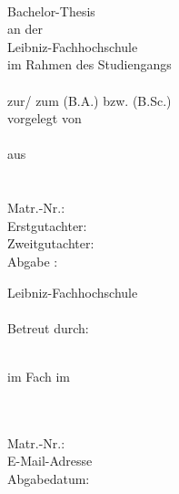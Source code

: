 \documentclass[a4paper, 11pt, german ]{article}
\def\True{1}
\begin{document}

\begin{titlepage}
\if\BachlorThesis\True
	\vspace*{20ex}
	\begin{center}
		
		\textbf{\thetitle}\\
		\vspace{10ex}
		Bachelor-Thesis\\
		an der \\
		Leibniz-Fachhochschule\\
		im Rahmen des Studiengangs \\
		\Studiengang \\
		zur/ zum \Abschlussbezeinung (B.A.) bzw. (B.Sc.) \\
	
		\vspace{1ex}
		vorgelegt von \\
		\theauthor \\
		aus\\
		\Addresse\\
		\Email\\
		
		\vspace{1ex}
		Matr.-Nr.: \MatrNummer\\
		
		\vspace{10ex}
		Erstgutachter: \Pruefer \\
		Zweitgutachter: \ZweitGutachter \\
		\vspace{1ex}
		Abgabe : \thedate
	\end{center}

\else


\raggedright
\vspace*{20ex}
Leibniz-Fachhochschule\\
\Studiengang\\
Betreut durch: \Pruefer

\vspace{10ex}
\begin{center}
	\ArtArbeit\\
	\vspace{1ex}
	im Fach \Modul im \Semester\\
	
	\vspace{10ex}
	\textbf{\thetitle}

\end{center}

\vspace{10ex}
\theauthor\\
\Addresse\\
Matr.-Nr.: \MatrNummer\\
\vspace{1ex}
E-Mail-Adresse \Email\\
\vspace{3ex}
Abgabedatum: \thedate

\fi
\restoregeometry
\end{titlepage}
\end{document}

